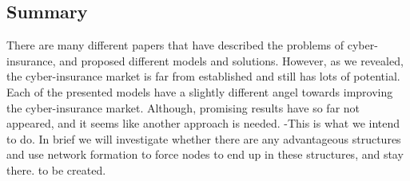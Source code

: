 \subsection{Summary}
There are many different papers that have described the problems of cyber-insurance, and proposed different models and solutions. However, as we revealed, the cyber-insurance market is far from established and still has lots of potential. Each of the presented models have a slightly different angel towards improving the cyber-insurance market. Although, promising results have so far not appeared, and it seems like another approach is needed. -This is what we intend to do. In brief we will investigate whether there are any advantageous structures and use network formation to force nodes to end up in these structures, and stay there. to be created. 


